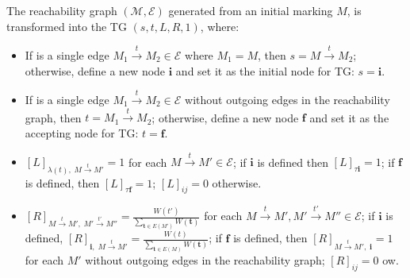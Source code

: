 \begin{definition}\label{def:transf}
The reachability graph $(\mathcal{M},\mathcal{E})$ generated from an initial marking $M$, is transformed into the TG $(s,t,L,R,1)$, where:
\begin{itemize}
	\item If is a single edge $M_1\overset{t}{\to}M_2\in\mathcal{E}$ where $M_1=M$, then $s=M\overset{t}{\to}M_2$; otherwise, define a new node $\textbf{i}$ and set it as the initial node for TG: $s=\textbf{i}$.
	\item If is a single edge $M_1\overset{t}{\to}M_2\in\mathcal{E}$ without outgoing edges in the reachability graph, then $t=M_1\overset{t}{\to}M_2$; otherwise, define a new node $\textbf{f}$ and set it as the accepting node for TG:  $t=\textbf{f}$.
	\item $[L]_{\lambda(t),\;M\overset{t}{\to} M'}=1$ for each $M\overset{t}{\to} M'\in\mathcal{E}$; if $\textbf{i}$ is defined then $[L]_{\tau\textbf{i}}=1$; if $\textbf{f}$ is defined, then $[L]_{\tau\textbf{f}}=1$; $[L]_{ij}=0$ otherwise.
	\item $[R]_{M\overset{t}{\to} M',\;M'\overset{t'}{\to} M''}=\frac{W(t')}{\sum_{\textbf{t}\in E(M')}W(\textbf{t})}$ for each $M\overset{t}{\to} M',M'\overset{t'}{\to} M''\in\mathcal{E}$; if $\textbf{i}$ is defined, $[R]_{\textbf{i},\;M\overset{t}{\to}M'}=\frac{W(t)}{\sum_{\textbf{t}\in E(M)}W(\textbf{t})}$; if $\textbf{f}$ is defined, then $[R]_{M\overset{t}{\to}M',\;\textbf{i}}=1$ for each $M'$ without outgoing edges in the reachability graph; $[R]_{ij}=0$ ow.
\end{itemize}
\end{definition}

\endinput
%
We can show that the TG obtained in Definition \ref{def:transf} preserves the same set of probabilistic traces associated by the reachability graph. The proof is omitted due to the lack of space.

\begin{example}
Figure \ref{fig:lmc} shows the TG obtained from the reachability graph in Figure \ref{fig:rg}. Nodes are labelled with the firing 
transition labels (in green), and edges preserve the probabilistic information from the reachability graph (in red). Intuitively, when a 
new initial node \textit{\textbf{i}} is inserted, we preserve all the initial probabilistic choices that a transition is fired from an initial 
marking $M$, while the intermediate edges inherit the probabilisitc choice of the firing transition from the subsequent choices. When 
a new final node \textit{\textbf{f}} is added, such edges always have probability $1$, and thus do not interfere with the 
initial traces' probability.
\end{example}

